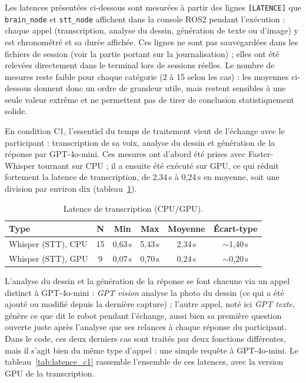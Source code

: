 \documentclass[11pt]{article}
\begin{document}
Les latences présentées ci-dessous sont mesurées à partir des lignes \texttt{[LATENCE]} que \texttt{brain\_node} et \texttt{stt\_node} affichent dans la console ROS2 pendant l'exécution : chaque appel (transcription, analyse du dessin, génération de texte ou d'image) y est chronométré et sa durée affichée. Ces lignes ne sont pas sauvegardées dans les fichiers de session (voir la partie portant sur la journalisation) ; elles ont été relevées directement dans le terminal lors de sessions réelles.
Le nombre de mesures reste faible pour chaque catégorie (2 à 15 selon les cas) : les moyennes ci-dessous donnent donc un ordre de grandeur utile, mais restent sensibles à une seule valeur extrême et ne permettent pas de tirer de conclusion statistiquement solide.

En condition C1, l'essentiel du temps de traitement vient de l'échange avec le participant : transcription de sa voix, analyse du dessin et génération de la réponse par GPT-4o-mini.
Ces mesures ont d'abord été prises avec Faster-Whisper tournant sur CPU ; il a ensuite été exécuté sur GPU, ce qui réduit fortement la latence de transcription, de 2,34\,s à 0,24\,s en moyenne, soit une division par environ dix (tableau~\ref{tab:latence_whisper_gpu}).

\begin{table}[H]
    \centering
    \begin{tabular}{@{}lccccc@{}}
        \toprule
        \textbf{Type} & \textbf{N} & \textbf{Min} & \textbf{Max} & \textbf{Moyenne} & \textbf{Écart-type} \\
        \midrule
        Whisper (STT), CPU & 15 & 0,63\,s & 5,43\,s & 2,34\,s & $\sim$1,40\,s \\
        Whisper (STT), GPU & 9  & 0,07\,s & 0,70\,s & 0,24\,s & $\sim$0,20\,s \\
        \bottomrule
    \end{tabular}
    \caption{Latence de transcription (CPU/GPU).}
    \label{tab:latence_whisper_gpu}
\end{table}

L'analyse du dessin et la génération de la réponse se font chacune via un appel distinct à GPT-4o-mini : \emph{GPT vision} analyse la photo du dessin (ce qui a été ajouté ou modifié depuis la dernière capture) ; l'autre appel, noté ici \emph{GPT texte}, génère ce que dit le robot pendant l'échange, aussi bien sa première question ouverte juste après l'analyse que ses relances à chaque réponse du participant. Dans le code, ces deux derniers cas sont traités par deux fonctions différentes, mais il s'agit bien du même type d'appel : une simple requête à GPT-4o-mini.
Le tableau~\ref{tab:latence_c1} rassemble l'ensemble de ces latences, avec la version GPU de la transcription.
\end{document}
